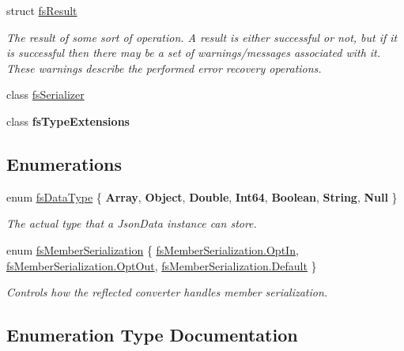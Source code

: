 \begin{DoxyCompactItemize}
struct \hyperlink{struct_full_serializer_1_1fs_result}{fs\+Result}
\begin{DoxyCompactList}\small\item\em The result of some sort of operation. A result is either successful or not, but if it is successful then there may be a set of warnings/messages associated with it. These warnings describe the performed error recovery operations. \end{DoxyCompactList}\item 
class \hyperlink{class_full_serializer_1_1fs_serializer}{fs\+Serializer}
\item 
class {\bfseries fs\+Type\+Extensions}
\end{DoxyCompactItemize}
\subsection*{Enumerations}
\begin{DoxyCompactItemize}
\item 
enum \hyperlink{namespace_full_serializer_a6eee33d63b94e40fdfcfc59af9fcfc82}{fs\+Data\+Type} \{ \newline
{\bfseries Array}, 
{\bfseries Object}, 
{\bfseries Double}, 
{\bfseries Int64}, 
\newline
{\bfseries Boolean}, 
{\bfseries String}, 
{\bfseries Null}
 \}\begin{DoxyCompactList}\small\item\em The actual type that a Json\+Data instance can store. \end{DoxyCompactList}
\item 
enum \hyperlink{namespace_full_serializer_ad0dc98cd54a3d07f8c579d82585906f8}{fs\+Member\+Serialization} \{ \hyperlink{namespace_full_serializer_ad0dc98cd54a3d07f8c579d82585906f8aea85bf11bf435701420717c07f3fbb6d}{fs\+Member\+Serialization.\+Opt\+In}, 
\hyperlink{namespace_full_serializer_ad0dc98cd54a3d07f8c579d82585906f8a416ca54b14eaffaf58722fc0441a0f2a}{fs\+Member\+Serialization.\+Opt\+Out}, 
\hyperlink{namespace_full_serializer_ad0dc98cd54a3d07f8c579d82585906f8a7a1920d61156abc05a60135aefe8bc67}{fs\+Member\+Serialization.\+Default}
 \}\begin{DoxyCompactList}\small\item\em Controls how the reflected converter handles member serialization. \end{DoxyCompactList}
\end{DoxyCompactItemize}


\subsection{Enumeration Type Documentation}
\mbox{\label{namespace_full_serializer_a6eee33d63b94e40fdfcfc59af9fcfc82}} 
